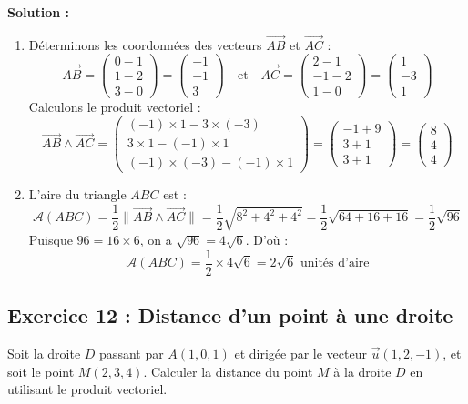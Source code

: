 \textbf{Solution :}
\begin{enumerate}
    \item Déterminons les coordonnées des vecteurs $\vec{AB}$ et $\vec{AC}$ :
    \[
    \vec{AB} = \begin{pmatrix} 0 - 1 \\ 1 - 2 \\ 3 - 0 \end{pmatrix} = \begin{pmatrix} -1 \\ -1 \\ 3 \end{pmatrix} \quad \text{et} \quad \vec{AC} = \begin{pmatrix} 2 - 1 \\ -1 - 2 \\ 1 - 0 \end{pmatrix} = \begin{pmatrix} 1 \\ -3 \\ 1 \end{pmatrix}
    \]
    Calculons le produit vectoriel :
    \[
    \vec{AB} \wedge \vec{AC} = \begin{pmatrix} (-1) \times 1 - 3 \times (-3) \\ 3 \times 1 - (-1) \times 1 \\ (-1) \times (-3) - (-1) \times 1 \end{pmatrix} = \begin{pmatrix} -1 + 9 \\ 3 + 1 \\ 3 + 1 \end{pmatrix} = \begin{pmatrix} 8 \\ 4 \\ 4 \end{pmatrix}
    \]
    
    \item L'aire du triangle $ABC$ est :
    \[
    \mathcal{A}(ABC) = \frac{1}{2} \|\vec{AB} \wedge \vec{AC}\| = \frac{1}{2} \sqrt{8^2 + 4^2 + 4^2} = \frac{1}{2} \sqrt{64 + 16 + 16} = \frac{1}{2} \sqrt{96}
    \]
    Puisque $96 = 16 \times 6$, on a $\sqrt{96} = 4\sqrt{6}$.
    D'où :
    \[
    \mathcal{A}(ABC) = \frac{1}{2} \times 4\sqrt{6} = 2\sqrt{6} \text{ unités d'aire}
    \]
\end{enumerate}

\subsection*{Exercice 12 : Distance d'un point à une droite}
Soit la droite $D$ passant par $A(1, 0, 1)$ et dirigée par le vecteur $\vec{u}(1, 2, -1)$, et soit le point $M(2, 3, 4)$.
Calculer la distance du point $M$ à la droite $D$ en utilisant le produit vectoriel.

